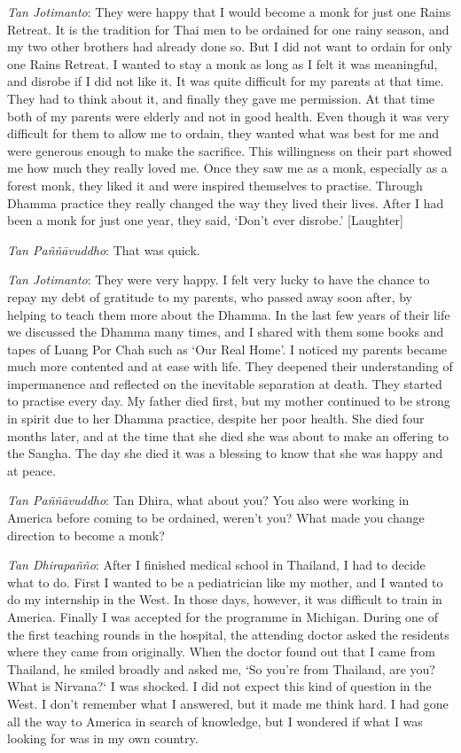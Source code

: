 \emph{Tan Jotimanto}: They were happy that I would become a monk for
just one Rains Retreat. It is the tradition for Thai men to be ordained
for one rainy season, and my two other brothers had already done so. But
I did not want to ordain for only one Rains Retreat. I wanted to stay a
monk as long as I felt it was meaningful, and disrobe if I did not like
it. It was quite difficult for my parents at that time. They had to
think about it, and finally they gave me permission. At that time both
of my parents were elderly and not in good health. Even though it was
very difficult for them to allow me to ordain, they wanted what was best
for me and were generous enough to make the sacrifice. This willingness
on their part showed me how much they really loved me. Once they saw me
as a monk, especially as a forest monk, they liked it and were inspired
themselves to practise. Through Dhamma practice they really changed the
way they lived their lives. After I had been a monk for just one year,
they said, `Don't ever disrobe.' {[}Laughter{]}

\emph{Tan Paññāvuddho}‎: That was quick.

\emph{Tan Jotimanto}: They were very happy. I felt very lucky to have
the chance to repay my debt of gratitude to my parents, who passed away
soon after, by helping to teach them more about the Dhamma. In the last
few years of their life we discussed the Dhamma many times, and I shared
with them some books and tapes of Luang Por Chah such as `Our Real
Home'. I noticed my parents became much more contented and at ease with
life. They deepened their understanding of impermanence and reflected on
the inevitable separation at death. They started to practise every day.
My father died first, but my mother continued to be strong in spirit due
to her Dhamma practice, despite her poor health. She died four months
later, and at the time that she died she was about to make an offering
to the Sangha. The day she died it was a blessing to know that she was
happy and at peace.

\emph{Tan Paññāvuddho}‎: Tan Dhira, what about you? You also were
working in America before coming to be ordained, weren't you? What made
you change direction to become a monk?

\emph{Tan Dhirapañño}‎: After I finished medical school in Thailand, I
had to decide what to do. First I wanted to be a pediatrician like my
mother, and I wanted to do my internship in the West. In those days,
however, it was difficult to train in America. Finally I was accepted
for the programme in Michigan. During one of the first teaching rounds
in the hospital, the attending doctor asked the residents where they
came from originally. When the doctor found out that I came from
Thailand, he smiled broadly and asked me, `So you're from Thailand, are
you? What is Nirvana?` I was shocked. I did not expect this kind of
question in the West. I don't remember what I answered, but it made me
think hard. I had gone all the way to America in search of knowledge,
but I wondered if what I was looking for was in my own country.

